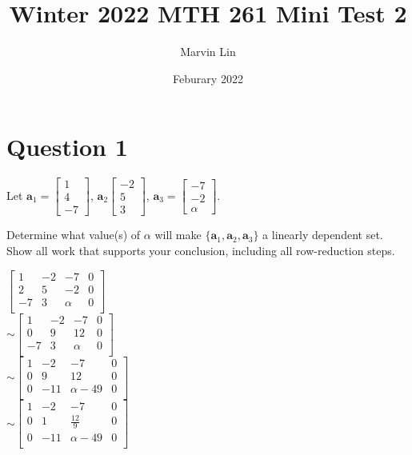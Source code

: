 \documentclass{report}
\title{Winter 2022 MTH 261 Mini Test 2}
\author{Marvin Lin}
\date{Feburary 2022}
\begin{document}
\maketitle

\section*{Question 1}
\begin{example}
    Let $\mathbf{a}_1 = \begin{bmatrix} 1 \\ 4 \\ -7 \end{bmatrix}$, $\mathbf{a}_2 \begin{bmatrix} -2 \\ 5 \\ 3 \end{bmatrix}$, $\mathbf{a}_3 = \begin{bmatrix} -7 \\ -2 \\ \alpha \end{bmatrix}$.
    
    Determine what value(s) of $\alpha$ will make $\{\mathbf{a}_1, \mathbf{a}_2, \mathbf{a}_3\}$ a linearly dependent set. Show all work that supports your conclusion, including all row-reduction steps.
\end{example}
$\begin{bmatrix}
    1 & -2 & -7 & 0 \\
    2 & 5 & -2 & 0 \\
    -7 & 3 & \alpha & 0 \\
\end{bmatrix}$\\
$\sim \begin{bmatrix}
    1 & -2 & -7 & 0 \\
    0 & 9 & 12 & 0 \\
    -7 & 3 & \alpha & 0 \\
\end{bmatrix}$\\
$\sim \begin{bmatrix}
    1 & -2 & -7 & 0 \\
    0 & 9 & 12 & 0 \\
    0 & -11 & \alpha-49 & 0 \\
\end{bmatrix}$\\
$\sim \begin{bmatrix}
    1 & -2 & -7 & 0 \\
    0 & 1 & \frac{12}{9} & 0 \\
    0 & -11 & \alpha-49 & 0 \\
\end{bmatrix}$\\
\end{document}
